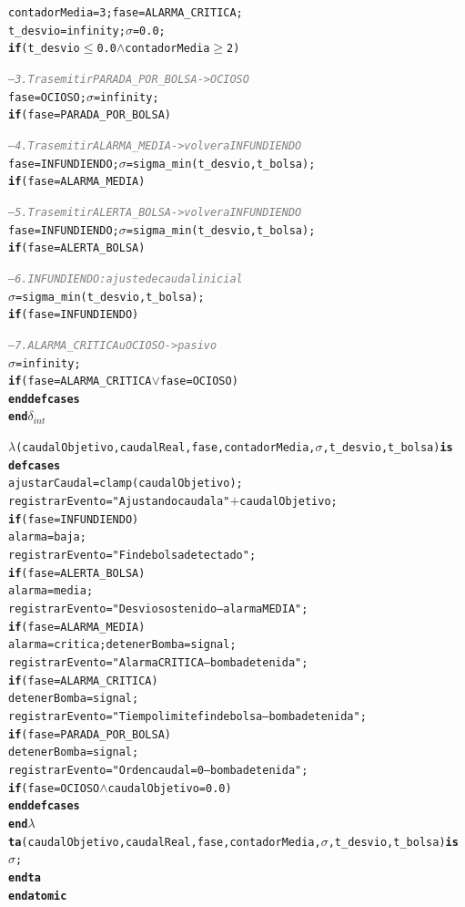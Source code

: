 \documentclass[12pt, a4paper]{article}
\newcommand{\cmlle}{$\leq$}
\newcommand{\cmlplus}{$+$}
\newcommand{\cmlgeq}{$\geq$}
\newcommand{\cmlwedge}{$\wedge$}
\newcommand{\cmlvee}{$\vee$}
\newcommand{\kw}[1]{\textbf{#1}}
\newcommand{\cmlsigma}{$\sigma$}
\newcommand{\dint}{$\delta_{\mathit{int}}$}
\newcommand{\clambda}{$\lambda$}
\newcommand{\cmlta}{\textbf{ta}}
\newcommand{\cmlcomment}[1]{\textit{\textcolor{gray}{#1}}}
\newenvironment{cmldevs}{%
  \begin{alltt}\small%
}{%
  \end{alltt}%
}
\begin{document}
\begin{center}
\begin{cmldevs}
        contadorMedia = 3; fase = ALARMA\_CRITICA;
        t\_desvio = infinity; \cmlsigma{} = 0.0;
            \kw{if} (t\_desvio \cmlle{} 0.0 \cmlwedge{} contadorMedia \cmlgeq{} 2)

        \cmlcomment{-- 3. Tras emitir PARADA\_POR\_BOLSA -> OCIOSO}
        fase = OCIOSO; \cmlsigma{} = infinity;
            \kw{if} (fase = PARADA\_POR\_BOLSA)

        \cmlcomment{-- 4. Tras emitir ALARMA\_MEDIA -> volver a INFUNDIENDO}
        fase = INFUNDIENDO; \cmlsigma{} = sigma\_min(t\_desvio, t\_bolsa);
            \kw{if} (fase = ALARMA\_MEDIA)

        \cmlcomment{-- 5. Tras emitir ALERTA\_BOLSA -> volver a INFUNDIENDO}
        fase = INFUNDIENDO; \cmlsigma{} = sigma\_min(t\_desvio, t\_bolsa);
            \kw{if} (fase = ALERTA\_BOLSA)

        \cmlcomment{-- 6. INFUNDIENDO: ajuste de caudal inicial}
        \cmlsigma{} = sigma\_min(t\_desvio, t\_bolsa);
            \kw{if} (fase = INFUNDIENDO)

        \cmlcomment{-- 7. ALARMA\_CRITICA u OCIOSO -> pasivo}
        \cmlsigma{} = infinity;
            \kw{if} (fase = ALARMA\_CRITICA \cmlvee{} fase = OCIOSO)
    \kw{end defcases}
\kw{end} \dint{}

\clambda{}(caudalObjetivo, caudalReal, fase, contadorMedia, \cmlsigma{}, t\_desvio, t\_bolsa) \kw{is}
    \kw{defcases}
        ajustarCaudal = clamp(caudalObjetivo);
        registrarEvento = "Ajustando caudal a " \cmlplus{} caudalObjetivo;
            \kw{if} (fase = INFUNDIENDO)
        alarma = baja;
        registrarEvento = "Fin de bolsa detectado";
            \kw{if} (fase = ALERTA\_BOLSA)
        alarma = media;
        registrarEvento = "Desvio sostenido -- alarma MEDIA";
            \kw{if} (fase = ALARMA\_MEDIA)
        alarma = critica; detenerBomba = signal;
        registrarEvento = "Alarma CRITICA -- bomba detenida";
            \kw{if} (fase = ALARMA\_CRITICA)
        detenerBomba = signal;
        registrarEvento = "Tiempo limite fin de bolsa -- bomba detenida";
            \kw{if} (fase = PARADA\_POR\_BOLSA)
        detenerBomba = signal;
        registrarEvento = "Orden caudal=0 -- bomba detenida";
            \kw{if} (fase = OCIOSO \cmlwedge{} caudalObjetivo = 0.0)
    \kw{end defcases}
\kw{end} \clambda{}
\cmlta{}(caudalObjetivo, caudalReal, fase, contadorMedia, \cmlsigma{}, t\_desvio, t\_bolsa) \kw{is}
    \cmlsigma{};
\kw{end} \cmlta{}
\kw{end atomic}
\end{cmldevs}
\label{fig:controlador-bomba}
\end{center}
\end{document}
